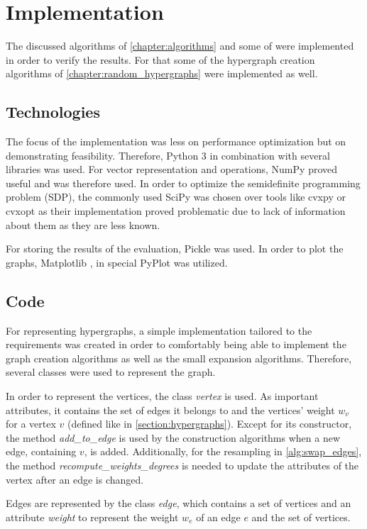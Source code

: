 \chapter{Implementation}\label{chapter:implementation}

The discussed algorithms of \cref{chapter:algorithms} and some of were implemented in order to verify the results. For that some of the hypergraph creation algorithms of \cref{chapter:random_hypergraphs} were implemented as well.
\section{Technologies}
The focus of the implementation was less on performance optimization but on demonstrating feasibility. Therefore, Python 3 in combination with several libraries was used.
For vector representation and operations, NumPy \cite{numpy} proved useful and was therefore used. In order to optimize the semidefinite programming problem (SDP), the commonly used SciPy \cite{scipy} was chosen over tools like cvxpy or cvxopt as their implementation proved problematic due to lack of information about them as they are less known.

For storing the results of the evaluation, Pickle was used. In order to plot the graphs, Matplotlib \cite{matplotlib}, in special PyPlot was utilized.



\section{Code}
For representing hypergraphs, a simple implementation tailored to the requirements was created in order to comfortably being able to implement the graph creation algorithms as well as the small expansion algorithms.
Therefore, several classes were used to represent the graph.

In order to represent the vertices, the class \textit{vertex} is used. As important attributes, it contains the set of edges it belongs to and the vertices' weight $w_v$ for a vertex $v$ (defined like in \cref{section:hypergraphs}). Except for its constructor, the method \textit{add\_to\_edge} is used by the construction algorithms when a new edge, containing $v$, is added. Additionally, for the resampling in \cref{alg:swap_edges}, the method \textit{recompute\_weights\_degrees} is needed to update the attributes of the vertex after an edge is changed.

Edges are represented by the class \textit{edge}, which contains a set of vertices and an attribute \textit{weight} to represent the weight $w_e$ of an edge $e$ and the set of vertices.

